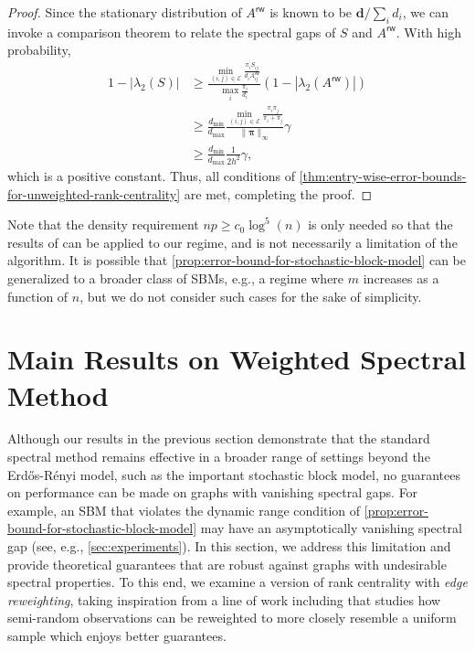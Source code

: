 \documentclass[sigconf,nonacm,pbalance]{acmart}
\begin{document}
\begin{proof}
Since the stationary distribution of $A^{\mathsf{rw}}$ is known to be $\bm{d}/\sum_i d_i$, we can invoke a comparison theorem \cite[Lemma 6]{NegahbanOhShah2017} to relate the spectral gaps of $S$ and $A^{\mathsf{rw}}$. With high probability,
\begin{align}
1-|\lambda_2(S)| &\geq  \frac{\displaystyle \min_{(i,j)\in\mathcal{E}} \frac{\pi_i S_{ij}}{d_i A^{\mathsf{rw}}_{ij}}}{\displaystyle \max_i \frac{\pi_i}{d_i}} (1-|\lambda_2(A^{\mathsf{rw}})|)\\
&\geq \frac{d_{\text{min}}}{d_{\text{max}}}\frac{\displaystyle\min_{(i,j)\in\mathcal{E}} \frac{\pi_i \pi_j}{\pi_i+\pi_j}}{\|\bm{\pi}\|_\infty} \gamma \\
&\geq \frac{d_{\text{min}}}{d_{\text{max}}} \frac{1}{2h^2} \gamma,
\end{align}
which is a positive constant. Thus, all conditions of \cref{thm:entry-wise-error-bounds-for-unweighted-rank-centrality} are met, completing the proof.
\end{proof}
Note that the density requirement $np \geq c_0 \log^5(n)$ is only needed so that the results of \cite{LoweTerveer2025} can be applied to our regime, and is not necessarily a limitation of the algorithm. It is possible that \cref{prop:error-bound-for-stochastic-block-model} can be generalized to a broader class of SBMs, e.g., a regime where $m$ increases as a function of $n$, but we do not consider such cases for the sake of simplicity.



        













\section{Main Results on Weighted Spectral Method}
Although our results in the previous section demonstrate that the standard spectral method remains effective in a broader range of settings beyond the Erd\H{o}s-R\'{e}nyi model, such as the important stochastic block model, no guarantees on performance can be made on graphs with vanishing spectral gaps. For example, an SBM that violates the dynamic range condition of \cref{prop:error-bound-for-stochastic-block-model} may have an asymptotically vanishing spectral gap (see, e.g., \cref{sec:experiments}). In this section, we address this limitation and provide theoretical guarantees that are robust against graphs with undesirable spectral properties. To this end, we examine a version of rank centrality with \emph{edge reweighting}, taking inspiration from a line of work including \cite{ChengGe2018,JambulapatiLiMusco2021,MonotoneAdversary} that studies how semi-random observations can be reweighted to more closely resemble a uniform sample which enjoys better guarantees.
\end{document}
